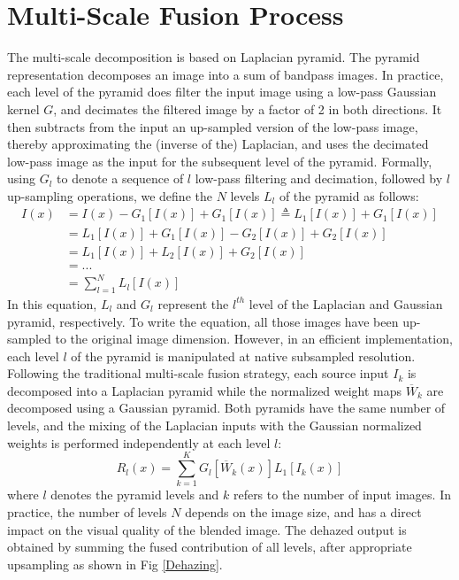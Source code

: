 \documentclass[hidelinks, 12pt]{report}
\begin{document}
\section{Multi-Scale Fusion Process}
The multi-scale decomposition is based on Laplacian pyramid. The pyramid representation decomposes an image into a sum of bandpass images. In practice, each level of the pyramid does filter the input image using a low-pass Gaussian kernel $G$, and decimates the filtered image by a factor of 2 in both directions. It then subtracts from the input an up-sampled version of the low-pass image, thereby approximating the (inverse of the) Laplacian, and uses the decimated low-pass image as the input for the subsequent level of the pyramid. Formally, using $G_l$ to denote a sequence of $l$ low-pass filtering and decimation, followed by $l$ up-sampling operations, we define the $N$ levels $L_l$ of the pyramid as follows:
\begin{equation}
\begin{split}
I(x) & = I(x)-G_1[I(x)]+G_1[I(x)] \triangleq L_1[I(x)]+G_1[I(x)]\\
& = L_1[I(x)]+G_1[I(x)]-G_2[I(x)]+G_2[I(x)]\\
& = L_1[I(x)]+L_2[I(x)]+G_2[I(x)]\\
& = ...\\
& = \sum_{l=1}^{N}L_l[I(x)]
\end{split}
\end{equation}
In this equation, $L_l$ and $G_l$ represent the $l^{th}$ level of the Laplacian and Gaussian pyramid, respectively. To write the equation, all those images have been up-sampled to the original image dimension. However, in an efficient implementation, each level $l$ of the pyramid is manipulated at native subsampled resolution. Following the traditional multi-scale fusion strategy, each source input $I_k$ is decomposed into a Laplacian pyramid while the normalized weight maps $\overline{W}_k$ are decomposed using a Gaussian pyramid. Both pyramids have the same number of levels, and the mixing of the Laplacian inputs with the Gaussian normalized weights is performed independently at each level $l$:
\begin{equation}
R_l(x)=\sum_{k=1}^{K}G_l[\overline{W}_k(x)]L_1[I_k(x)]
\end{equation}
where $l$ denotes the pyramid levels and $k$ refers to the number of input images. In practice, the number of levels $N$ depends on the image size, and has a direct impact on the visual quality of the blended image. The dehazed output is obtained by summing the fused contribution of all levels, after appropriate upsampling as shown in Fig \ref{Dehazing}.
\end{document}
